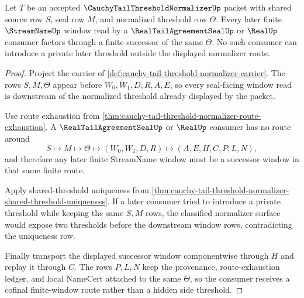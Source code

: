 \begin{theorem}
\label{thm:cauchy-tail-threshold-normalizer-window-cofinality}
Let $T$ be an accepted $\CauchyTailThresholdNormalizerUp$ packet with shared source row $S$, seal row $M$, and normalized threshold row $\Theta$. Every later finite $\StreamNameUp$ window read by a $\RealTailAgreementSealUp$ or $\RealUp$ consumer factors through a finite successor of the same $\Theta$. No such consumer can introduce a private later threshold outside the displayed normalizer route.
\end{theorem}
\begin{proof}
Project the carrier of \autoref{def:cauchy-tail-threshold-normalizer-carrier}. The rows $S,M,\Theta$ appear before $W_0,W_1,D,R,A,E$, so every seal-facing window read is downstream of the normalized threshold already displayed by the packet.

Use route exhaustion from \autoref{thm:cauchy-tail-threshold-normalizer-route-exhaustion}. A $\RealTailAgreementSealUp$ or $\RealUp$ consumer has no route around
$$
S\longmapsto M\longmapsto\Theta\longmapsto(W_0,W_1,D,R)\longmapsto(A,E,H,C,P,L,N),
$$
and therefore any later finite StreamName window must be a successor window in that same finite route.

Apply shared-threshold uniqueness from \autoref{thm:cauchy-tail-threshold-normalizer-shared-threshold-uniqueness}. If a later consumer tried to introduce a private threshold while keeping the same $S,M$ rows, the classified normalizer surface would expose two thresholds before the downstream window rows, contradicting the uniqueness row.

Finally transport the displayed successor window componentwise through $H$ and replay it through $C$. The rows $P,L,N$ keep the provenance, route-exhaustion ledger, and local NameCert attached to the same $\Theta$, so the consumer receives a cofinal finite-window route rather than a hidden side threshold.
\end{proof}

